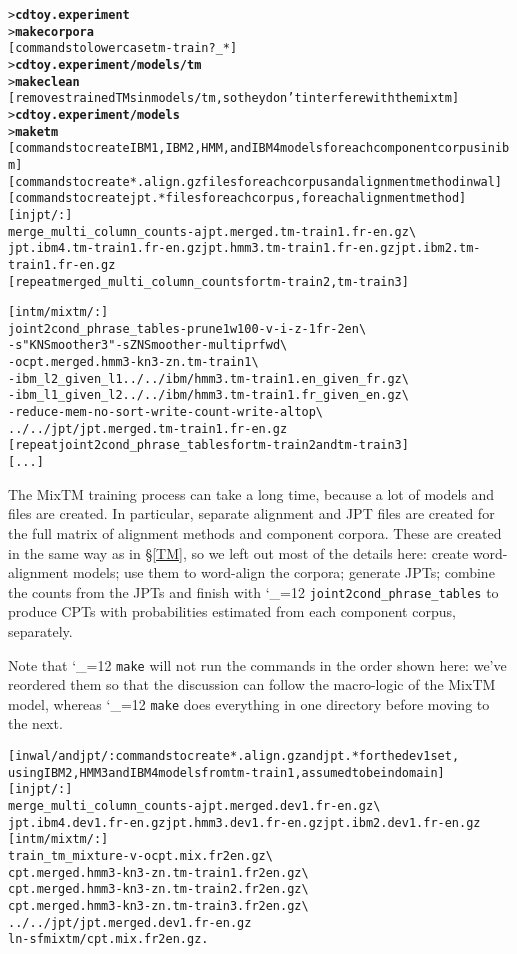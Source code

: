 \documentclass[11pt,letterpaper]{article}
\newcommand{\bs}{\textbackslash{}}
\def\code{\begingroup\catcode`\_=12 \codex}
\newcommand{\codex}[1]{\texttt{#1}\endgroup}
\begin{document}
\begin{small}
\begin{alltt}
   > \textbf{cd toy.experiment}
   > \textbf{make corpora}
   [commands to lowercase tm-train?_*]
   > \textbf{cd toy.experiment/models/tm}
   > \textbf{make clean}
   [removes trained TMs in models/tm, so they don't interfere with the mixtm]
   > \textbf{cd toy.experiment/models}
   > \textbf{make tm}
   [commands to create IBM1, IBM2, HMM, and IBM4 models for each component corpus in ibm]
   [commands to create *.align.gz files for each corpus and alignment method in wal]
   [commands to create jpt.* files for each corpus, for each alignment method]
   [in jpt/:]
   merge_multi_column_counts -a jpt.merged.tm-train1.fr-en.gz \bs
      jpt.ibm4.tm-train1.fr-en.gz jpt.hmm3.tm-train1.fr-en.gz jpt.ibm2.tm-train1.fr-en.gz
   [repeat merged_multi_column_counts for tm-train2, tm-train3]

   [in tm/mixtm/:]
   joint2cond_phrase_tables -prune1w 100 -v -i -z -1 fr -2 en \bs
      -s "KNSmoother 3" -s ZNSmoother -multipr fwd \bs
      -o cpt.merged.hmm3-kn3-zn.tm-train1 \bs
      -ibm_l2_given_l1  ../../ibm/hmm3.tm-train1.en_given_fr.gz \bs
      -ibm_l1_given_l2  ../../ibm/hmm3.tm-train1.fr_given_en.gz \bs
      -reduce-mem -no-sort -write-count -write-al top \bs
      ../../jpt/jpt.merged.tm-train1.fr-en.gz
   [repeat joint2cond_phrase_tables for tm-train2 and tm-train3]
   [...]
\end{alltt}
\end{small}

The MixTM training process can take a long time, because a lot of models and
files are created. In particular, separate alignment and JPT files are created
for the full matrix of alignment methods and component corpora.  These are
created in the same way as in \S\ref{TM}, so we left out most of the details
here: create word-alignment models; use them to word-align the corpora;
generate JPTs; combine the counts from the JPTs and finish with
\code{joint2cond_phrase_tables} to produce CPTs with probabilities estimated
from each component corpus, separately.

Note that \code{make} will not run the commands in the order shown here: we've
reordered them so that the discussion can follow the macro-logic of the MixTM
model, whereas \code{make} does everything in one directory before moving
to the next.

\begin{small}
\begin{alltt}
   [in wal/ and jpt/: commands to create *.align.gz and jpt.* for the dev1 set,
    using IBM2, HMM3 and IBM4 models from tm-train1, assumed to be in domain]
   [in jpt/:]
   merge_multi_column_counts -a jpt.merged.dev1.fr-en.gz \bs
      jpt.ibm4.dev1.fr-en.gz jpt.hmm3.dev1.fr-en.gz jpt.ibm2.dev1.fr-en.gz
   [in tm/mixtm/:]
   train_tm_mixture -v -o cpt.mix.fr2en.gz \bs
      cpt.merged.hmm3-kn3-zn.tm-train1.fr2en.gz \bs
      cpt.merged.hmm3-kn3-zn.tm-train2.fr2en.gz \bs
      cpt.merged.hmm3-kn3-zn.tm-train3.fr2en.gz \bs
      ../../jpt/jpt.merged.dev1.fr-en.gz
   ln -sf mixtm/cpt.mix.fr2en.gz .
\end{alltt}
\end{small}
\end{document}
